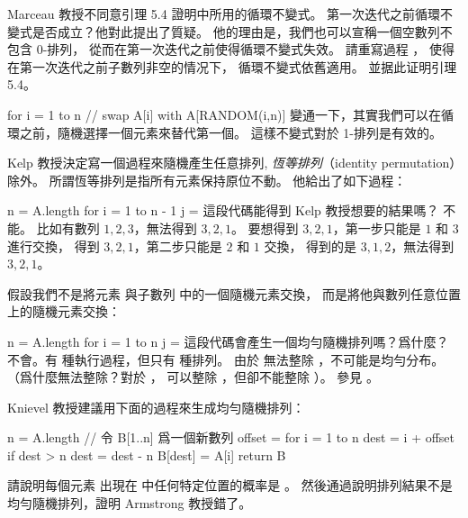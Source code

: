 \startsection[
  title={Randomized algorithms},
]

\startEXERCISE
Marceau 教授不同意引理 5.4 證明中所用的循環不變式。
第一次迭代之前循環不變式是否成立？他對此提出了質疑。
他的理由是，我們也可以宣稱一個空數列不包含 0-排列，
從而在第一次迭代之前使得循環不變式失效。
請重寫過程 ，
使得在第一次迭代之前子數列非空的情况下，
循環不變式依舊適用。
並据此证明引理 5.4。

\startCLRSCODE
for i = 1 to n
	// swap A[i] with A[RANDOM(i,n)]
\stopCLRSCODE
\stopEXERCISE
\startANSWER
變通一下，其實我們可以在循環之前，隨機選擇一個元素來替代第一個。
這樣不變式對於 1-排列是有效的。
\stopANSWER

\startEXERCISE
Kelp 教授決定寫一個過程來隨機產生任意排列,
\emph{恆等排列}（identity permutation）除外。
所謂恆等排列是指所有元素保持原位不動。
他給出了如下過程：

\startCLRSCODE
n = A.length
for i = 1 to n - 1
	j = 
\stopCLRSCODE
這段代碼能得到 Kelp 教授想要的結果嗎？
\stopEXERCISE
\startANSWER
不能。
比如有數列 $1,2,3$，無法得到 $3,2,1$。
要想得到 $3,2,1$，第一步只能是 $1$ 和 $3$ 進行交換，
得到 $3,2,1$，第二步只能是 $2$ 和 $1$ 交換，
得到的是 $3,1,2$，無法得到 $3,2,1$。
\stopANSWER

\startEXERCISE
假設我們不是將元素  與子數列  中的一個隨機元素交換，
而是將他與數列任意位置上的隨機元素交換：

\startCLRSCODE
n = A.length
for i = 1 to n
	j = 
\stopCLRSCODE
這段代碼會產生一個均勻隨機排列嗎？爲什麼？
\stopEXERCISE
\startANSWER
不會。有  種執行過程，但只有  種排列。
由於  無法整除 ，不可能是均勻分布。
（爲什麼無法整除？對於 ，  可以整除 ，但卻不能整除 ）。
參見 。
\stopANSWER

\startEXERCISE
Knievel 教授建議用下面的過程來生成均勻隨機排列：

\startCLRSCODE
n = A.length
// 令 B[1..n] 爲一個新數列
offset = 
for i = 1 to n
	dest = i + offset
	if dest > n
		dest = dest - n
	B[dest] = A[i]
return B
\stopCLRSCODE

請說明每個元素  出現在  中任何特定位置的概率是 。
然後通過說明排列結果不是均勻隨機排列，證明 Armstrong 教授錯了。
\stopEXERCISE

